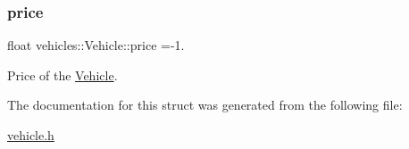 \subsubsection{\texorpdfstring{price}{price}}
{\footnotesize\ttfamily float vehicles\+::\+Vehicle\+::price =-\/1.}



Price of the \hyperlink{structvehicles_1_1_vehicle}{Vehicle}. 



The documentation for this struct was generated from the following file\+:\begin{DoxyCompactItemize}
\item 
\hyperlink{vehicle_8h}{vehicle.\+h}\end{DoxyCompactItemize}
